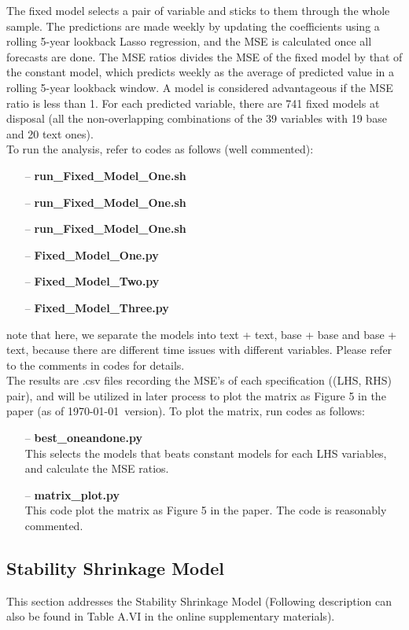 \documentclass[11pt]{article}
\begin{document}
The fixed model selects a pair of variable and sticks to them through the whole sample. The predictions are made weekly by updating the coefficients using a rolling 5-year lookback Lasso regression, and the MSE is calculated once all forecasts are done. The MSE ratios divides the MSE of the fixed model by that of the constant model, which predicts weekly as the average of predicted value in a rolling 5-year lookback window. A model is considered advantageous if the MSE ratio is less than 1. For each predicted variable, there are 741 fixed models at disposal (all the non-overlapping combinations of the 39 variables with 19 base and 20 text ones).\\

To run the analysis, refer to codes as follows (well commented):
\begin{enumerate}
	\item[--] \textbf{run\_Fixed\_Model\_One.sh}
	\item[--] \textbf{run\_Fixed\_Model\_One.sh}
	\item[--] \textbf{run\_Fixed\_Model\_One.sh}
	\item[--] \textbf{Fixed\_Model\_One.py}
	\item[--] \textbf{Fixed\_Model\_Two.py}
	\item[--] \textbf{Fixed\_Model\_Three.py}
\end{enumerate}
note that here, we separate the models into text + text, base + base and base + text, because there are different time issues with different variables. Please refer to the comments in codes for details. \\

The results are .csv files recording the MSE's of each specification ((LHS, RHS) pair), and will be utilized in later process to plot the matrix as Figure 5 in the paper (as of \today\ version). To plot the matrix, run codes as follows:
\begin{enumerate}
	\item[--] \textbf{best\_oneandone.py}\\
	This selects the models that beats constant models for each LHS variables, and calculate the MSE ratios.
	\item[--] \textbf{matrix\_plot.py}\\
	This code plot the matrix as Figure 5 in the paper. The code is reasonably commented.

\end{enumerate}

\subsection{Stability Shrinkage Model}
This section addresses the Stability Shrinkage Model (Following description can also be found in Table A.VI in the online supplementary materials). \\
\end{document}
